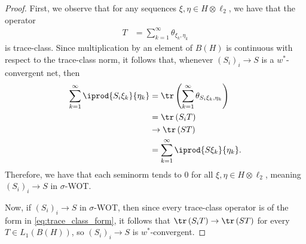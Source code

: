 \documentclass[10pt]{mypackage}
\begin{document}
\begin{proof}
  First, we observe that for any sequences $\xi,\eta\in H\otimes \ell_2$, we have that the operator
  \begin{align*}
    T &= \sum_{k=1}^{\infty}\theta_{\xi_k,\eta_k}\label{eq:trace_class_form}\tag{$\ast$}
  \end{align*}
  is trace-class. Since multiplication by an element of $B(H)$ is continuous with respect to the trace-class norm, it follows that, whenever $\left( S_i \right)_i\rightarrow S$ is a $w^{\ast}$-convergent net, then
  \begin{align*}
    \sum_{k=1}^{\infty} \iprod{S_i\xi_k}{\eta_k} &= \tr\left( \sum_{k=1}^{\infty}\theta_{S_i\xi_k,\eta_k} \right)\\
                                                 &= \tr\left( S_iT \right)\\
                                                 &\rightarrow \tr\left( ST \right)\\
                                                 &= \sum_{k=1}^{\infty} \iprod{S\xi_k}{\eta_k}.
  \end{align*}
  Therefore, we have that each seminorm tends to $0$ for all $\xi,\eta\in H\otimes \ell_2$, meaning $\left( S_i \right)_{i}\rightarrow S$ in $\sigma$-WOT.

  Now, if $\left( S_i \right)_i\rightarrow S$ in $\sigma$-WOT, then since every trace-class operator is of the form in \eqref{eq:trace_class_form}, it follows that $\tr\left( S_iT \right) \rightarrow \tr\left( ST \right)$ for every $T\in L_1\left( B(H) \right)$, so $\left( S_i \right)_i\rightarrow S$ is $w^{\ast}$-convergent.
\end{proof}
\end{document}
